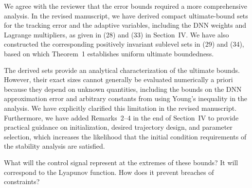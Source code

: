 \documentclass[12pt,english]{reviewresponse}
\begin{document}
\begin{revresponse}
  We agree with the reviewer that the error bounds required a more comprehensive analysis.
  In the revised manuscript, we have derived compact ultimate-bound sets for the tracking error and the adaptive variables, including the DNN weights and Lagrange multipliers, as given in (28) and (33) in Section~IV.
  We have also constructed the corresponding positively invariant sublevel sets in (29) and (34), based on which Theorem~1 establishes uniform ultimate boundedness.

  \bigskip

  The derived sets provide an analytical characterization of the ultimate bounds. 
  However, their exact sizes cannot generally be evaluated numerically a priori because they depend on unknown quantities, including the bounds on the DNN approximation error and arbitrary constants from using Young's inequality in the analysis.
  We have explicitly clarified this limitation in the revised manuscript. 
  Furthermore, we have added Remarks~2--4 in the end of Section~IV to provide practical guidance on initialization, desired trajectory design, and parameter selection, which increases the likelihood that the initial condition requirements of the stability analysis are satisfied.

\end{revresponse}

% 
\begin{revcomment}[1][1]{}
	What will the control signal represent at the extremes of these bounds? It will correspond to the Lyapunov function. How does it prevent breaches of constraints?
\end{revcomment}
\end{document}
